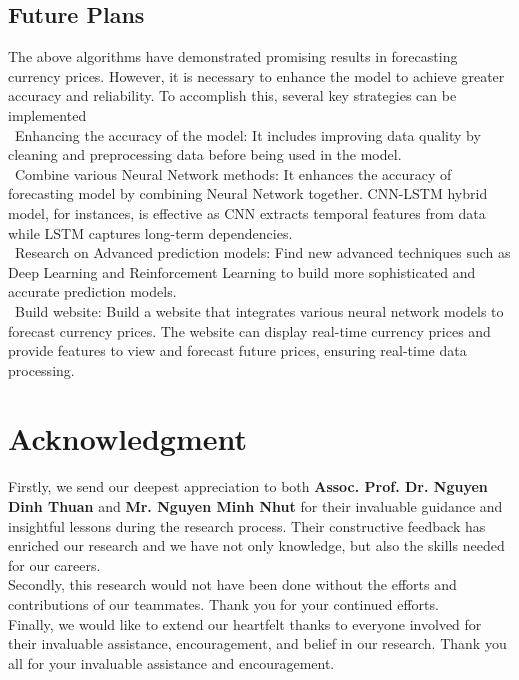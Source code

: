 \documentclass{ieeeojies}
\begin{document}
\subsection{Future Plans}
The above algorithms have demonstrated promising results in forecasting currency prices. However, it is necessary to enhance the model to achieve greater accuracy and reliability. To accomplish this, several key strategies can be implemented \\
\indent\textbullet\ Enhancing the accuracy of the model: It includes improving data quality by cleaning and preprocessing data before being used in the model.\\
\indent\textbullet\ Combine various Neural Network methods: It enhances the accuracy of forecasting model by combining Neural Network together. CNN-LSTM hybrid model, for instances, is effective as CNN extracts temporal features from data while LSTM captures long-term dependencies. \\
\indent\textbullet\ Research on Advanced prediction models: Find new advanced techniques such as Deep Learning and Reinforcement Learning to build more sophisticated and accurate prediction models. \\
\indent\textbullet\ Build website: Build a website that integrates various neural network models to forecast currency prices. The website can display real-time currency prices and provide features to view and forecast future prices, ensuring real-time data processing. \\

\section*{Acknowledgment}
Firstly, we send our deepest appreciation to both \textbf{Assoc. Prof. Dr. Nguyen Dinh Thuan} and \textbf{Mr. Nguyen Minh Nhut} for their invaluable guidance and insightful lessons during the research process. Their constructive feedback has enriched our research and we have not only knowledge, but also the skills needed for our careers. 
\\Secondly, this research would not have been done without the efforts and contributions of our teammates. Thank you for your continued efforts. 
\\Finally, we would like to extend our heartfelt thanks to everyone involved for their invaluable assistance, encouragement, and belief in our research. Thank you all for your invaluable assistance and encouragement.

\EOD
\printbibliography
\end{document}
